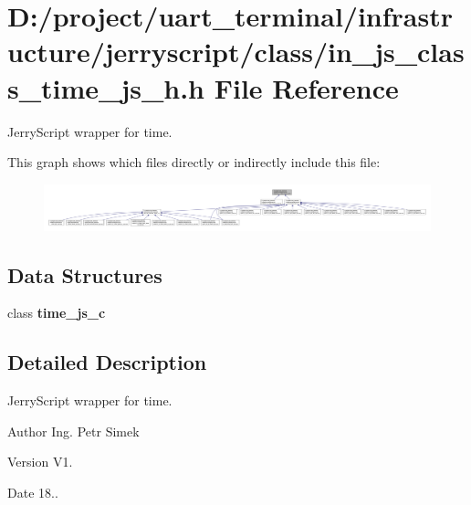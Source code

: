 \section{D\+:/project/uart\+\_\+terminal/infrastructure/jerryscript/class/in\+\_\+js\+\_\+class\+\_\+time\+\_\+js\+\_\+h.h File Reference}
\label{in__js__class__time__js__h_8h}


Jerry\+Script wrapper for time.  


This graph shows which files directly or indirectly include this file\+:
\nopagebreak
\begin{figure}[H]
\begin{center}
\leavevmode
\includegraphics[width=350pt]{in__js__class__time__js__h_8h__dep__incl}
\end{center}
\end{figure}
\subsection*{Data Structures}
\begin{DoxyCompactItemize}
\item 
class \textbf{ time\+\_\+js\+\_\+c}
\end{DoxyCompactItemize}


\subsection{Detailed Description}
Jerry\+Script wrapper for time. 

\begin{DoxyAuthor}{Author}
Ing. Petr Simek 
\end{DoxyAuthor}
\begin{DoxyVersion}{Version}
V1. 
\end{DoxyVersion}
\begin{DoxyDate}{Date}
18.. 
\end{DoxyDate}
